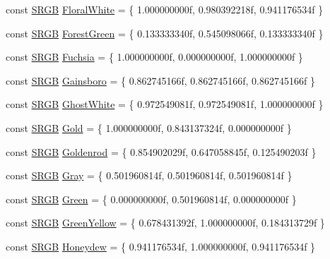 \begin{DoxyCompactItemize}
\item 
const \hyperlink{structmage_1_1_s_r_g_b}{S\+R\+GB} \hyperlink{namespacemage_1_1color_abec765244c78f5d10b9fbdea111be1f8}{Floral\+White} = \{ 1.\+000000000f, 0.\+980392218f, 0.\+941176534f \}
\item 
const \hyperlink{structmage_1_1_s_r_g_b}{S\+R\+GB} \hyperlink{namespacemage_1_1color_a3ebf27996eb559ee5bf941ee6f77a2a0}{Forest\+Green} = \{ 0.\+133333340f, 0.\+545098066f, 0.\+133333340f \}
\item 
const \hyperlink{structmage_1_1_s_r_g_b}{S\+R\+GB} \hyperlink{namespacemage_1_1color_a5cb845630f908c0e50b9ab831fe9ab92}{Fuchsia} = \{ 1.\+000000000f, 0.\+000000000f, 1.\+000000000f \}
\item 
const \hyperlink{structmage_1_1_s_r_g_b}{S\+R\+GB} \hyperlink{namespacemage_1_1color_a8c04c8f95fa039376ed9427ed66a44bc}{Gainsboro} = \{ 0.\+862745166f, 0.\+862745166f, 0.\+862745166f \}
\item 
const \hyperlink{structmage_1_1_s_r_g_b}{S\+R\+GB} \hyperlink{namespacemage_1_1color_a8bfaff6141aba03ebc2e66108b268b7a}{Ghost\+White} = \{ 0.\+972549081f, 0.\+972549081f, 1.\+000000000f \}
\item 
const \hyperlink{structmage_1_1_s_r_g_b}{S\+R\+GB} \hyperlink{namespacemage_1_1color_a6eafe437aa82470f52c8e8827c9df7ce}{Gold} = \{ 1.\+000000000f, 0.\+843137324f, 0.\+000000000f \}
\item 
const \hyperlink{structmage_1_1_s_r_g_b}{S\+R\+GB} \hyperlink{namespacemage_1_1color_a833b431e0f7d36811a237fc3c9b681a7}{Goldenrod} = \{ 0.\+854902029f, 0.\+647058845f, 0.\+125490203f \}
\item 
const \hyperlink{structmage_1_1_s_r_g_b}{S\+R\+GB} \hyperlink{namespacemage_1_1color_a8f0f4dd06fc37474e20a347af3523dcf}{Gray} = \{ 0.\+501960814f, 0.\+501960814f, 0.\+501960814f \}
\item 
const \hyperlink{structmage_1_1_s_r_g_b}{S\+R\+GB} \hyperlink{namespacemage_1_1color_a70a471f8796824272417d82a0c78b63b}{Green} = \{ 0.\+000000000f, 0.\+501960814f, 0.\+000000000f \}
\item 
const \hyperlink{structmage_1_1_s_r_g_b}{S\+R\+GB} \hyperlink{namespacemage_1_1color_a19b0da7d9b4d5ddb2eceec40df11ba57}{Green\+Yellow} = \{ 0.\+678431392f, 1.\+000000000f, 0.\+184313729f \}
\item 
const \hyperlink{structmage_1_1_s_r_g_b}{S\+R\+GB} \hyperlink{namespacemage_1_1color_a50381d0ae2bed45ad565661cbcc1729a}{Honeydew} = \{ 0.\+941176534f, 1.\+000000000f, 0.\+941176534f \}
\item 

\end{DoxyCompactItemize}
